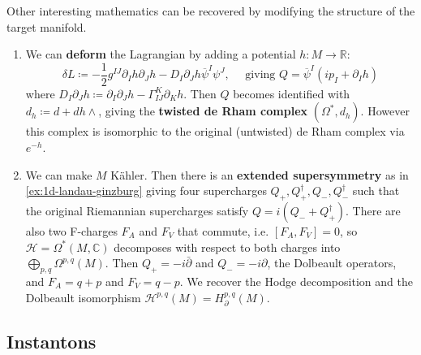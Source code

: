 \documentclass{report}
\theoremstyle{plain}
\theoremstyle{definition}
\theoremstyle{remark}
\newcommand{\di}{\partial}
\newcommand{\bC}{\mathbb{C}}
\newcommand{\bR}{\mathbb{R}}
\newcommand{\cH}{\mathcal{H}}
\newcommand{\bdi}{\bar{\di}}
\newcommand{\cnj}{\overline}
\begin{document}
Other interesting mathematics can be recovered by modifying the
structure of the target manifold.
\begin{enumerate}
\item We can {\bf deform} the Lagrangian by adding a potential
  $h\colon M \to \bR$:
  \begin{equation} \label{eq:1d-deformed-sigma-model-supercharge}
    \delta L \coloneqq -\frac{1}{2} g^{IJ} \di_I h \di_J h - D_I \di_J h \cnj \psi^I \psi^J, \quad \text{ giving } Q = \cnj\psi^I(ip_I + \di_I h)
  \end{equation}
  where $D_I \di_J h \coloneqq \di_I \di_J h - \Gamma^K_{IJ} \di_K h$.
  Then $Q$ becomes identified with $d_h\coloneqq d + dh \wedge$,
  giving the {\bf twisted de Rham complex} $(\Omega^*, d_h)$. However
  this complex is isomorphic to the original (untwisted) de Rham
  complex via $e^{-h}$.
\item We can make $M$ K\"ahler. Then there is an {\bf extended
  supersymmetry} as in \ref{ex:1d-landau-ginzburg} giving four
  supercharges $Q_+, Q_+^\dag, Q_-, Q_-^\dag$ such that the original
  Riemannian supercharges satisfy $Q = i(Q_- + Q_+^\dag)$. There are
  also two F-charges $F_A$ and $F_V$ that commute, i.e. $[F_A, F_V] =
  0$, so $\cH = \Omega^*(M, \bC)$ decomposes with respect to both
  charges into $\bigoplus_{p,q} \Omega^{p,q}(M)$. Then $Q_+ = -i\bdi$
  and $Q_- = -i\di$, the Dolbeault operators, and $F_A = q+p$ and $F_V
  = q-p$. We recover the Hodge decomposition and the Dolbeault
  isomorphism $\cH^{p,q}(M) = H^{p,q}_{\di}(M)$.
\end{enumerate}

\subsection{Instantons}
\end{document}
